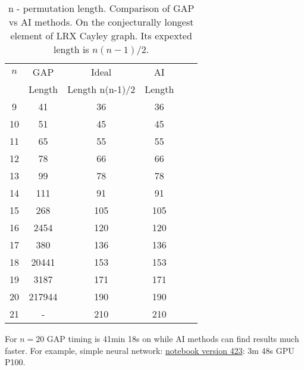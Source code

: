 \documentclass[atmp]{ipart_v1}
\numberwithin{equation}{section}
\theoremstyle{plain}%
\begin{document}
\begin{table}[h]
    \centering
    \begin{tabular}{|c|c|c|c|c|c|}
        \hline
        $n$  &  GAP    & Ideal            &   AI      \\
             &  Length & Length n(n-1)/2  & Length    \\
        \hline
        9    &  41     & 36               &  36   \\
        \hline
        10   &    51   & 45               &  45       \\
        \hline
        11   &     65      & 55             &  55     \\
        \hline
        12   &    78       &  66          & 66     \\
        \hline        
        13   &    99       &  78           &   78       \\
        \hline        
        14   &   111       &  91           &   91     \\
        \hline        
        15     &   268      &  105         &  105    \\
        \hline        
        16     &    2454    &  120         &  120     \\
        \hline        
        17   &     380     &  136         & 136    \\
        \hline        
        18   &     20441   &   153        & 153    \\
        \hline        
        19   &      3187      & 171        & 171    \\
        \hline      
        20   &     217944    & 190        & 190      \\
        \hline 
        21   &   -           & 210     & 210        \\
        \hline           
    \end{tabular}
    \captionsetup{skip=10pt} 
    \caption{n - permutation length. Comparison of GAP vs AI methods. On the conjecturally longest element of LRX Cayley graph. Its expexted length is $n(n-1)/2$.  }
    \label{tab:example}
\end{table}
For $n=20$ GAP timing is 41min 18s on while AI methods can find results much faster.
For example, simple neural network: \href{https://www.kaggle.com/code/alexandervc/lrx-cayleypy-rl-mdqn?scriptVersionId=224270083}{notebook version 423}: 3m 48s GPU P100.
\end{document}
